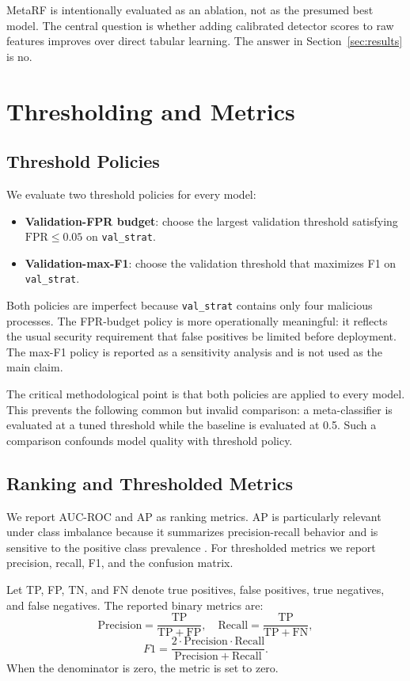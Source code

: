 \documentclass[journal]{IEEEtran}
\begin{document}
MetaRF is intentionally evaluated as an ablation, not as the presumed best model. The central question is whether adding calibrated detector scores to raw features improves over direct tabular learning. The answer in Section~\ref{sec:results} is no.

\section{Thresholding and Metrics}
\label{sec:thresholds}

\subsection{Threshold Policies}

We evaluate two threshold policies for every model:
\begin{itemize}
    \item \textbf{Validation-FPR budget}: choose the largest validation threshold satisfying $\mathrm{FPR} \leq 0.05$ on \texttt{val\_strat}.
    \item \textbf{Validation-max-F1}: choose the validation threshold that maximizes F1 on \texttt{val\_strat}.
\end{itemize}
Both policies are imperfect because \texttt{val\_strat} contains only four malicious processes. The FPR-budget policy is more operationally meaningful: it reflects the usual security requirement that false positives be limited before deployment. The max-F1 policy is reported as a sensitivity analysis and is not used as the main claim.

The critical methodological point is that both policies are applied to every model. This prevents the following common but invalid comparison: a meta-classifier is evaluated at a tuned threshold while the baseline is evaluated at 0.5. Such a comparison confounds model quality with threshold policy.

\subsection{Ranking and Thresholded Metrics}

We report AUC-ROC and AP as ranking metrics. AP is particularly relevant under class imbalance because it summarizes precision-recall behavior and is sensitive to the positive class prevalence \cite{saito2015}. For thresholded metrics we report precision, recall, F1, and the confusion matrix.

Let TP, FP, TN, and FN denote true positives, false positives, true negatives, and false negatives. The reported binary metrics are:
\[
\mathrm{Precision} = \frac{\mathrm{TP}}{\mathrm{TP}+\mathrm{FP}},
\quad
\mathrm{Recall} = \frac{\mathrm{TP}}{\mathrm{TP}+\mathrm{FN}},
\]
\[
F1 = \frac{2\cdot \mathrm{Precision}\cdot \mathrm{Recall}}{\mathrm{Precision}+\mathrm{Recall}}.
\]
When the denominator is zero, the metric is set to zero.
\end{document}
